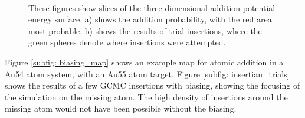 \begin{figure}
    \centering
     \\
	\caption[Addition biasing with a Lennard Jones potential.]{These figures show slices of the three dimensional addition potential energy surface. a) shows the addition probability, with the red area most probable. b) shows the results of trial insertions, where the green spheres denote where insertions were attempted.}
	\label{fig:biasing}
\end{figure}
Figure \ref{subfig: biasing_map} shows an example map for atomic addition in a Au54 atom system, with an Au55 atom target.
Figure \ref{subfig: insertian_trials} shows the results of a few GCMC insertions with biasing, showing the focusing of the simulation on the missing atom.
The high density of insertions around the missing atom would not have been possible without the biasing.
